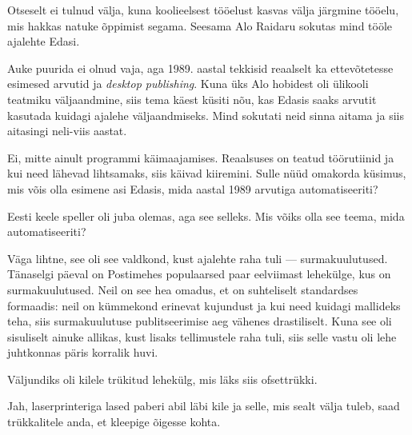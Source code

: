 
Otseselt ei tulnud välja, kuna koolieelsest tööelust kasvas välja järgmine 
tööelu, mis hakkas natuke õppimist segama. Seesama Alo 
Raidaru sokutas mind tööle ajalehte 
Edasi.


Auke puurida ei olnud vaja, aga 1989. aastal tekkisid 
reaalselt ka ettevõtetesse esimesed arvutid ja 
\emph{desktop publishing}. Kuna üks Alo hobidest oli ülikooli teatmiku väljaandmine, siis tema käest küsiti nõu, kas Edasis saaks arvutit 
kasutada kuidagi ajalehe väljaandmiseks. Mind sokutati neid
sinna aitama ja siis aitasingi neli-viis aastat.


Ei, mitte ainult programmi käimaajamises. Reaalsuses on teatud töörutiinid ja kui need lähevad lihtsamaks, siis käivad kiiremini. Sulle nüüd 
omakorda küsimus, mis võis olla esimene asi Edasis, 
mida aastal 1989 arvutiga automatiseeriti?


Eesti keele speller oli juba olemas, aga see selleks. Mis võiks olla see 
teema, mida automatiseeriti?


Väga lihtne, see oli see valdkond, kust ajalehte raha tuli --- surmakuulutused. 
Tänaselgi päeval on Postimehes populaarsed paar eelviimast lehekülge, kus on 
surmakuulutused. Neil on see hea omadus, et on suhteliselt standardses 
formaadis: neil on kümmekond erinevat 
kujundust ja kui need kuidagi mallideks teha, siis 
surmakuulutuse publitseerimise aeg vähenes drastiliselt. Kuna see oli 
sisuliselt ainuke allikas, kust lisaks tellimustele raha tuli, siis selle vastu 
oli lehe juhtkonnas päris korralik huvi.


Väljundiks oli kilele trükitud lehekülg, mis läks siis ofsettrükki.


Jah, laserprinteriga lased paberi abil läbi kile ja selle, mis sealt välja tuleb, 
saad trükkalitele anda, et kleepige õigesse kohta.

